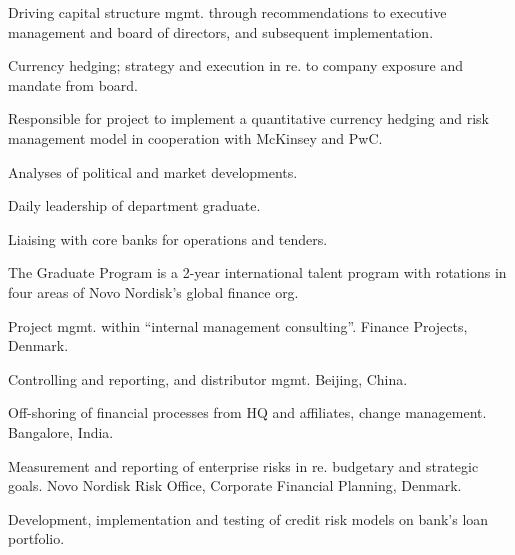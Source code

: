 \documentclass[a4paper]{janus-resume}
\begin{document}
\begin{minipage}[t]{0.49\textwidth}

\begin{tightitemize}
\item Driving capital structure mgmt. through recommendations to executive management and board of directors, and subsequent implementation.
\item Currency hedging; strategy and execution in re. to company exposure and mandate from board.
\item Responsible for project to implement a quantitative currency hedging and risk management model in cooperation with McKinsey and PwC. 
\item Analyses of political and market developments.
\item Daily leadership of department graduate.
\item Liaising with core banks for operations and tenders.
\end{tightitemize}

\sectionspace %



\begin{tightitemize}
\item The Graduate Program is a 2-year international talent program with rotations in four areas of Novo Nordisk's global finance org.
\item Project mgmt. within ``internal management consulting''. Finance Projects, Denmark.
\item Controlling and reporting, and distributor mgmt. Beijing, China.
\item Off-shoring of financial processes from HQ and affiliates, change management. Bangalore, India.
\item Measurement and reporting of enterprise risks in re. budgetary and strategic goals. Novo Nordisk Risk Office, Corporate Financial Planning, Denmark.
\end{tightitemize}

\sectionspace %


\begin{tightitemize}
\item Development, implementation and testing of credit risk models on bank's loan portfolio.
\end{tightitemize}


\end{minipage}
\end{document}
